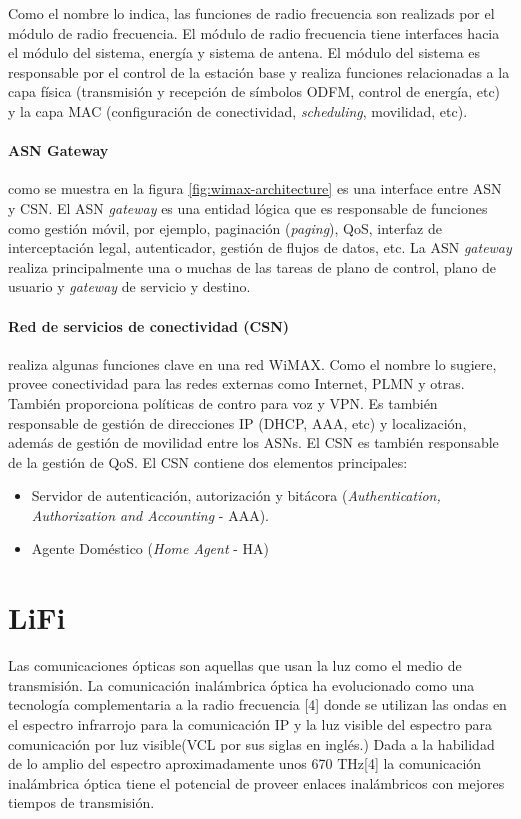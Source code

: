 \documentclass[10pt,journal,compsoc]{IEEEtran}
\begin{document}
Como el nombre lo indica, las funciones de radio frecuencia son realizads por el módulo de radio frecuencia. El módulo de radio frecuencia tiene interfaces hacia el módulo del sistema, energía y sistema de antena. El módulo del sistema es responsable por el control de la estación base y realiza funciones relacionadas a la capa física (transmisión y recepción de símbolos ODFM, control de energía, etc) y la capa MAC (configuración de conectividad, \emph{scheduling}, movilidad, etc).

\paragraph{ASN Gateway} como se muestra en la figura \ref{fig:wimax-architecture} es una interface entre ASN y CSN. El ASN \emph{gateway} es una entidad lógica que es responsable de funciones como gestión móvil, por ejemplo, paginación (\emph{paging}), QoS, interfaz de interceptación legal, autenticador, gestión de flujos de datos, etc. La ASN \emph{gateway} realiza principalmente una o muchas de las tareas de plano de control, plano de usuario y \emph{gateway} de servicio y destino.

\paragraph{Red de servicios de conectividad (CSN)} realiza algunas funciones clave en una red WiMAX. Como el nombre lo sugiere, provee conectividad para las redes externas como Internet, PLMN y otras. También proporciona políticas de contro para voz y VPN. Es también responsable de gestión de direcciones IP (DHCP, AAA, etc) y localización, además de gestión de movilidad entre los ASNs. El CSN es también responsable de la gestión de QoS. El CSN contiene dos elementos principales:
\begin{itemize}
    \item Servidor de autenticación, autorización y bitácora (\emph{Authentication, Authorization and Accounting} - AAA).
    \item Agente Doméstico (\emph{Home Agent} - HA)
\end{itemize}

\section{LiFi}

Las comunicaciones ópticas son aquellas que usan la luz como el medio de transmisión. La comunicación inalámbrica óptica ha evolucionado como una tecnología complementaria a la radio frecuencia [4] donde se utilizan las ondas en el espectro infrarrojo para la comunicación IP y la luz visible del espectro para comunicación por luz visible(VCL por sus siglas en inglés.) Dada a la habilidad de lo amplio del espectro aproximadamente unos 670 THz[4] la comunicación inalámbrica óptica tiene el potencial de proveer enlaces inalámbricos con mejores tiempos de transmisión. 
\end{document}
